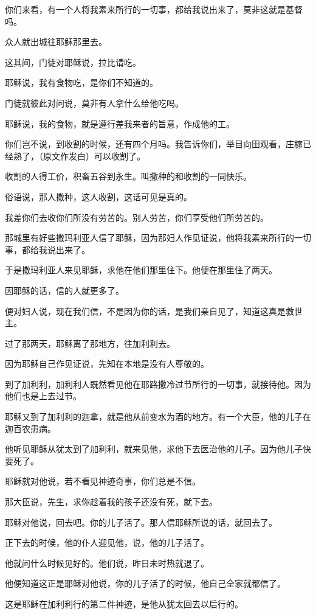 \documentclass[12pt,oneside]{book}
\begin{document}
你们来看，有一个人将我素来所行的一切事，都给我说出来了，莫非这就是基督吗。

众人就出城往耶稣那里去。

这其间，门徒对耶稣说，拉比请吃。

耶稣说，我有食物吃，是你们不知道的。

门徒就彼此对问说，莫非有人拿什么给他吃吗。

耶稣说，我的食物，就是遵行差我来者的旨意，作成他的工。

你们岂不说，到收割的时候，还有四个月吗。我告诉你们，举目向田观看，庄稼已经熟了，（原文作发白）可以收割了。

收割的人得工价，积畜五谷到永生。叫撒种的和收割的一同快乐。

俗语说，那人撒种，这人收割，这话可见是真的。

我差你们去收你们所没有劳苦的。别人劳苦，你们享受他们所劳苦的。

那城里有好些撒玛利亚人信了耶稣，因为那妇人作见证说，他将我素来所行的一切事，都给我说出来了。

于是撒玛利亚人来见耶稣，求他在他们那里住下。他便在那里住了两天。

因耶稣的话，信的人就更多了。

便对妇人说，现在我们信，不是因为你的话，是我们亲自见了，知道这真是救世主。

过了那两天，耶稣离了那地方，往加利利去。

因为耶稣自己作见证说，先知在本地是没有人尊敬的。

到了加利利，加利利人既然看见他在耶路撒冷过节所行的一切事，就接待他。因为他们也是上去过节。

耶稣又到了加利利的迦拿，就是他从前变水为酒的地方。有一个大臣，他的儿子在迦百农患病。

他听见耶稣从犹太到了加利利，就来见他，求他下去医治他的儿子。因为他儿子快要死了。

耶稣就对他说，若不看见神迹奇事，你们总是不信。

那大臣说，先生，求你趁着我的孩子还没有死，就下去。

耶稣对他说，回去吧。你的儿子活了。那人信耶稣所说的话，就回去了。

正下去的时候，他的仆人迎见他，说，他的儿子活了。

他就问什么时候见好的。他们说，昨日未时热就退了。

他便知道这正是耶稣对他说，你的儿子活了的时候，他自己全家就都信了。

这是耶稣在加利利行的第二件神迹，是他从犹太回去以后行的。
\end{document}
